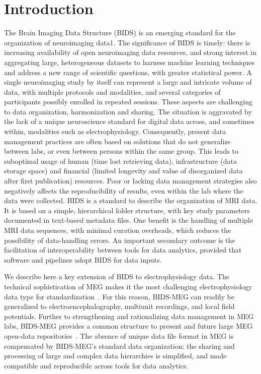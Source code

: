 \clearpage
\section{Introduction}
\label{sec:bids_intro}
The Brain Imaging Data Structure (BIDS) is an emerging standard for the organization of neuroimaging data1. The significance of BIDS is timely: there is increasing availability of open neuroimaging data resources, and strong interest in aggregating large, heterogeneous datasets to harness machine learning techniques and address a new range of scientific questions, with greater statistical power. A single neuroimaging study by itself can represent a large and intricate volume of data, with multiple protocols and modalities, and several categories of participants possibly enrolled in repeated sessions. These aspects are challenging to data organization, harmonization and sharing. The situation is aggravated by the lack of a unique neuroscience standard for digital data across, and sometimes within, modalities such as electrophysiology. Consequently, present data management practices are often based on solutions that do not generalize between labs, or even between persons within the same group. This leads to suboptimal usage of human (time lost retrieving data), infrastructure (data storage space) and financial (limited longevity and value of disorganized data after first publication) resources. Poor or lacking data management strategies also negatively affects the reproducibility of results, even within the lab where the data were collected. 
BIDS is a standard to describe the organization of \ac{MRI} data. It is based on a simple, hierarchical folder structure, with key study parameters documented in text-based metadata files. One benefit is the handling of multiple MRI data sequences, with minimal curation overheads, which reduces the possibility of data-handling errors. An important secondary outcome is the facilitation of interoperability between tools for data analytics, provided that software and pipelines adopt BIDS for data inputs. 

We describe here a key extension of BIDS to electrophysiology data. The technical sophistication of MEG makes it the most challenging electrophysiology data type for standardization~\citep{baillet2017magnetoencephalography}. For this reason, BIDS-MEG can readily be generalized to electroencephalography, multiunit recordings, and local field potentials. Further to strengthening and rationalizing data management in MEG labs, BIDS-MEG provides a common structure to present and future large MEG open-data repositories~\citep{larson2013adding, taylor2015cambridge, niso2016omega}. The absence of unique data file format in MEG is compensated by BIDS-MEG’s standard data organization: the sharing and processing of large and complex data hierarchies is simplified, and made compatible and reproducible across tools for data analytics. 

